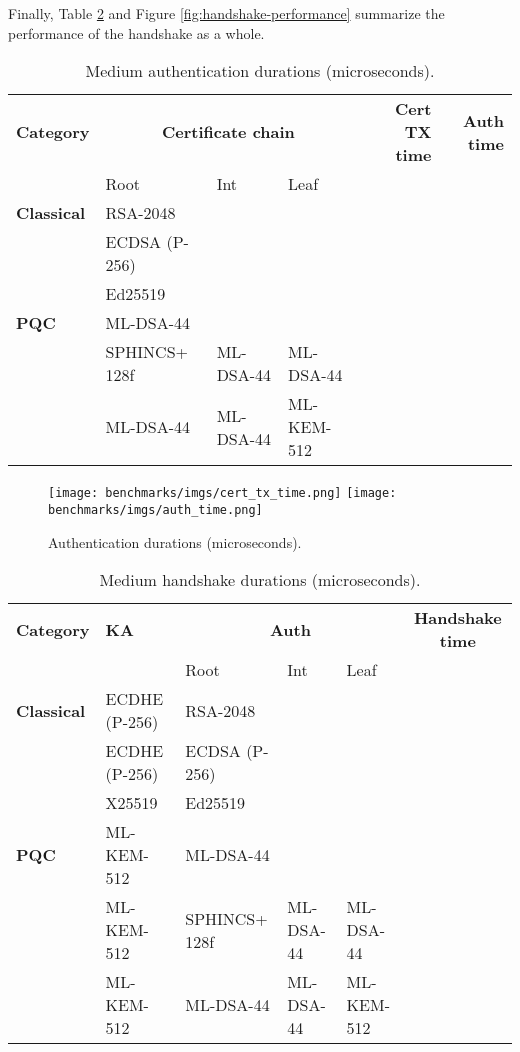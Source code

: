 \documentclass[letterpaper,12pt,titlepage,oneside,final]{book}
\begin{document}
Finally, Table \ref{tab:handshake-performance} and Figure \ref{fig:handshake-performance} summarize the performance of the handshake as a whole.

\begin{table}[h]
\footnotesize
\centering
\begin{tabular}{llllrr}
\toprule
    \textbf{Category}
    & \multicolumn{3}{c}{\textbf{Certificate chain}}
    & \textbf{Cert TX time}
    & \textbf{Auth time} \\
    \cmidrule(lr){2-4}
    & Root & Int & Leaf \\
\midrule
    \textbf{Classical} 
    & RSA-2048 \\
    & ECDSA (P-256) \\
    & Ed25519 \\
\midrule
    \textbf{PQC}
    & ML-DSA-44 \\
    & SPHINCS+ 128f & ML-DSA-44 & ML-DSA-44 \\
    & ML-DSA-44 & ML-DSA-44 & ML-KEM-512 \\
\bottomrule
\end{tabular}
\caption{Medium authentication durations (microseconds).}
\label{tab:auth-performance-comparison}
\end{table}

\begin{figure}[h]
    \centering
    \texttt{[image: benchmarks/imgs/cert\_tx\_time.png]}
    \texttt{[image: benchmarks/imgs/auth\_time.png]}
    \caption{Authentication durations (microseconds).}
    \label{fig:auth-performance-comparison}
\end{figure}

\begin{table}[h]
\footnotesize
\centering
\begin{tabular}{lllllr}
\toprule
    \textbf{Category}
    & \textbf{KA}
    & \multicolumn{3}{c}{\textbf{Auth}}
    & \multicolumn{1}{c}{\textbf{Handshake time}} \\
    \cmidrule{3-5}
    & & Root & Int & Leaf \\
\midrule
    \textbf{Classical}
    & ECDHE (P-256) & RSA-2048 & & & \\
    & ECDHE (P-256) & ECDSA (P-256) & & & \\
    & X25519 & Ed25519 & & & \\
\midrule
    \textbf{PQC}
    & ML-KEM-512 & ML-DSA-44 & & & \\
    & ML-KEM-512 & SPHINCS+ 128f & ML-DSA-44 & ML-DSA-44 & \\
    & ML-KEM-512 & ML-DSA-44 & ML-DSA-44 & ML-KEM-512 & \\
\bottomrule
\end{tabular}
\caption{Medium handshake durations (microseconds).}
\label{tab:handshake-performance}
\end{table}
\end{document}
